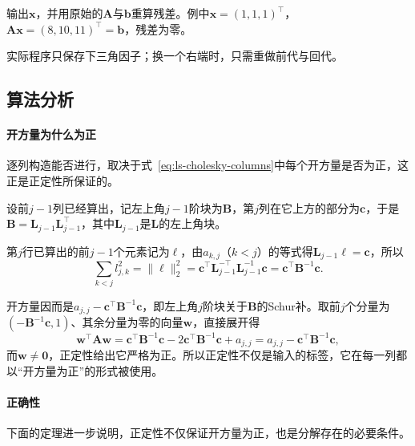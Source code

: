 输出$\bm x$，并用原始的$\bm A$与$\bm b$重算残差。例中$\bm x=(1,1,1)^\top$，$\bm A\bm x=(8,10,11)^\top=\bm b$，残差为零。

实际程序只保存下三角因子；换一个右端时，只需重做前代与回代。

\subsection{算法分析}
\paragraph{开方量为什么为正}
逐列构造能否进行，取决于式~\eqref{eq:ls-cholesky-columns}中每个开方量是否为正，这正是正定性所保证的。

设前$j-1$列已经算出，记左上角$j-1$阶块为$\bm B$，第$j$列在它上方的部分为$\bm c$，于是$\bm B=\bm L_{j-1}\bm L_{j-1}^\top$，其中$\bm L_{j-1}$是$\bm L$的左上角块。

第$j$行已算出的前$j-1$个元素记为$\bm\ell$，由$a_{k,j}$（$k<j$）的等式得$\bm L_{j-1}\bm\ell=\bm c$，所以
\[
 \sum_{k<j}l_{j,k}^2=\lVert\bm\ell\rVert_2^2
 =\bm c^\top\bm L_{j-1}^{-\top}\bm L_{j-1}^{-1}\bm c
 =\bm c^\top\bm B^{-1}\bm c .
\]

开方量因而是$a_{j,j}-\bm c^\top\bm B^{-1}\bm c$，即左上角$j$阶块关于$\bm B$的Schur补。取前$j$个分量为$(-\bm B^{-1}\bm c,1)$、其余分量为零的向量$\bm w$，直接展开得
\[
 \bm w^\top\bm A\bm w
 =\bm c^\top\bm B^{-1}\bm c-2\bm c^\top\bm B^{-1}\bm c+a_{j,j}
 =a_{j,j}-\bm c^\top\bm B^{-1}\bm c,
\]
而$\bm w\neq\bm0$，正定性给出它严格为正。所以正定性不仅是输入的标签，它在每一列都以“开方量为正”的形式被使用。

\paragraph{正确性}
下面的定理进一步说明，正定性不仅保证开方量为正，也是分解存在的必要条件。

